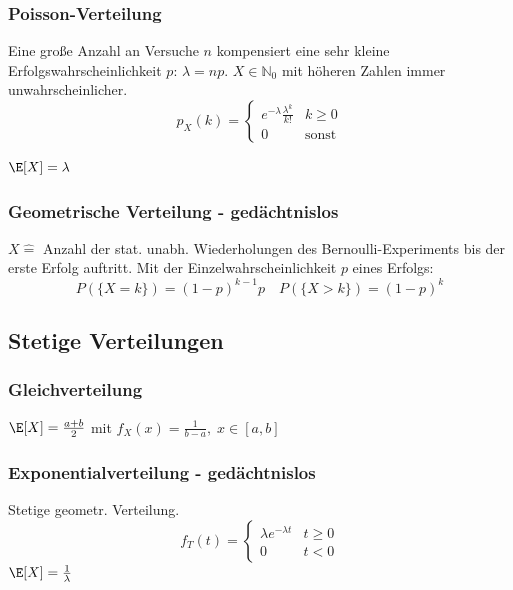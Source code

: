 \begin{sectionbox}
    \subsubsection{Poisson-Verteilung}
    Eine große Anzahl an Versuche $n$ kompensiert eine sehr kleine Erfolgswahrscheinlichkeit $p$: $\lambda=np$. $X\in\mathbb N_0$ mit höheren Zahlen immer unwahrscheinlicher.
    \begin{equation*}
        p_X(k) = \begin{cases}
            e^{-\lambda}\frac{\lambda^k}{k!} & k \ge 0      \\
            0                                & \text{sonst}
        \end{cases}
    \end{equation*}

    $\E[X]=\lambda$
\end{sectionbox}

\begin{sectionbox}
    \subsubsection{Geometrische Verteilung - gedächtnislos}
    $X \widehat{=}$ Anzahl der stat. unabh. Wiederholungen des Bernoulli-Experiments bis der erste Erfolg auftritt. Mit der Einzelwahrscheinlichkeit $p$ eines Erfolgs:
    \begin{equation*}
        P(\{X=k\})=(1-p)^{k-1}p \quad P(\{X > k\})=(1-p)^k
    \end{equation*}
\end{sectionbox}

\subsection{Stetige Verteilungen}
\subsubsection{Gleichverteilung}
$\E[X] = \frac{a+b}{2}$ mit $f_X(x) = \frac{1}{b-a}, \; x\in[a,b]$

\begin{sectionbox}
    \subsubsection{Exponentialverteilung - gedächtnislos}
    Stetige geometr. Verteilung.
    \begin{equation*}
        f_T(t) = \begin{cases}
            \lambda e^{-\lambda t} & t \ge 0 \\
            0                      & t < 0
        \end{cases}
    \end{equation*}
    $\E[X] = \frac{1}{\lambda}$
\end{sectionbox}

